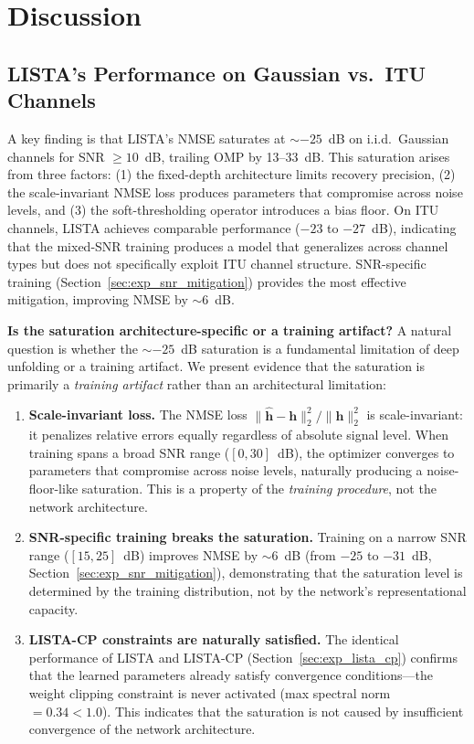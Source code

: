 \documentclass[a4paper,fleqn]{cas-sc}
\begin{document}
\section{Discussion}\label{sec:discussion}

\subsection{LISTA's Performance on Gaussian vs.~ITU Channels}

A key finding is that LISTA's NMSE saturates at $\sim$$-25$~dB on i.i.d.~Gaussian channels for SNR $\geq 10$~dB, trailing OMP by 13--33~dB. This saturation arises from three factors: (1) the fixed-depth architecture limits recovery precision, (2) the scale-invariant NMSE loss produces parameters that compromise across noise levels, and (3) the soft-thresholding operator introduces a bias floor. On ITU channels, LISTA achieves comparable performance ($-23$ to $-27$~dB), indicating that the mixed-SNR training produces a model that generalizes across channel types but does not specifically exploit ITU channel structure. SNR-specific training (Section~\ref{sec:exp_snr_mitigation}) provides the most effective mitigation, improving NMSE by $\sim$6~dB.

\textbf{Is the saturation architecture-specific or a training artifact?} A natural question is whether the $\sim$$-25$~dB saturation is a fundamental limitation of deep unfolding or a training artifact. We present evidence that the saturation is primarily a \emph{training artifact} rather than an architectural limitation:

\begin{enumerate}
\item \textbf{Scale-invariant loss.} The NMSE loss $\|\hat{\mathbf{h}} - \mathbf{h}\|_2^2 / \|\mathbf{h}\|_2^2$ is scale-invariant: it penalizes relative errors equally regardless of absolute signal level. When training spans a broad SNR range ($[0, 30]$~dB), the optimizer converges to parameters that compromise across noise levels, naturally producing a noise-floor-like saturation. This is a property of the \emph{training procedure}, not the network architecture.

\item \textbf{SNR-specific training breaks the saturation.} Training on a narrow SNR range ($[15, 25]$~dB) improves NMSE by $\sim$6~dB (from $-25$ to $-31$~dB, Section~\ref{sec:exp_snr_mitigation}), demonstrating that the saturation level is determined by the training distribution, not by the network's representational capacity.

\item \textbf{LISTA-CP constraints are naturally satisfied.} The identical performance of LISTA and LISTA-CP (Section~\ref{sec:exp_lista_cp}) confirms that the learned parameters already satisfy convergence conditions---the weight clipping constraint is never activated (max spectral norm $= 0.34 < 1.0$). This indicates that the saturation is not caused by insufficient convergence of the network architecture.
\end{enumerate}
\end{document}
